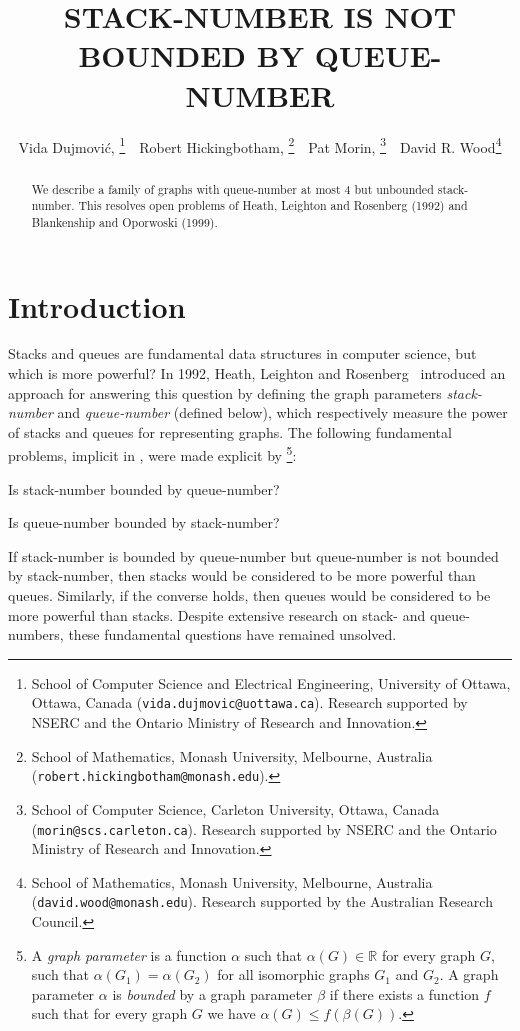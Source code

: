\documentclass[kpfonts]{patmorin}
\title{\MakeUppercase{Stack-Number is not Bounded by Queue-Number}}
\author{%
	Vida Dujmovi\'c,\!\!%
	\thanks{School of Computer Science and Electrical Engineering,
		University of Ottawa, Ottawa, Canada (\texttt{vida.dujmovic@uottawa.ca}).
		Research supported by NSERC and the Ontario Ministry of Research and Innovation.}
	\,\,
	Robert Hickingbotham,\!\!%
	\thanks{School of Mathematics, Monash University, Melbourne, Australia (\texttt{robert.hickingbotham@monash.edu}).}
	\,\,
	Pat Morin,\!\!%
	\thanks{School of Computer Science, Carleton University, Ottawa, Canada (\texttt{morin@scs.carleton.ca}). Research  supported by NSERC and the Ontario Ministry of Research and Innovation.}
	\,\,
	David R. Wood\thanks{School of Mathematics, Monash University, Melbourne, Australia (\texttt{david.wood@monash.edu}). Research supported by the Australian Research Council.}
}
\renewcommand{\leq}{\leqslant}
\begin{document}
\maketitle

\begin{abstract}
We describe a family of graphs with queue-number at most 4 but unbounded stack-number. This resolves open problems of Heath, Leighton and Rosenberg (1992) and Blankenship and Oporwoski (1999).
\end{abstract}

\bigskip

\section{Introduction}

Stacks and queues are fundamental data structures in computer science, but which is more powerful? In 1992, Heath, Leighton and Rosenberg~\cite{HLR92,HR92} introduced an approach for answering this question by defining the graph parameters \textit{stack-number} and \textit{queue-number} (defined below), which respectively measure the power of stacks and queues for representing graphs. The following fundamental problems, implicit in \citep{HLR92,HR92}, were made explicit by \citet{DujWoo05}\footnote{A \emph{graph parameter} is a function $\alpha$ such that $\alpha(G)\in\mathbb{R}$ for every graph $G$, such that $\alpha(G_1)=\alpha(G_2)$ for all isomorphic graphs $G_1$ and $G_2$. A graph parameter $\alpha$ is \textit{bounded} by a graph parameter $\beta$ if there exists a function $f$ such that for every graph $G$ we have $\alpha(G) \leq f(\beta(G))$.}:
\begin{compactitem}
	\item Is stack-number bounded by queue-number?
	\item Is queue-number bounded by stack-number?
\end{compactitem}

If stack-number is bounded by queue-number but queue-number is not bounded by stack-number, then stacks would be considered to be more powerful than queues. Similarly, if the converse holds, then queues would be considered to be more powerful than stacks. Despite extensive research on stack- and queue-numbers, these fundamental questions have remained unsolved.
\end{document}
